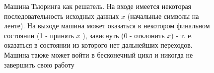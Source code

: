 \begin{figure}
\centering



\caption{Машина Тьюринга как решатель. На входе имеется некоторая
  последовательность исходных данных $x$ (начальные символы на ленте).
На выходе машина может оказаться в некотором финальном состоянии
(1 - принять $x$ ), зависнуть (0 - отклонить $x$) - т. е. оказаться в
состоянии из которого нет дальнейших переходов. Машина также может
войти в бесконечный цикл и никогда не завершить свою работу} 
\label{figAddAlgoDecidability}
\end{figure}
